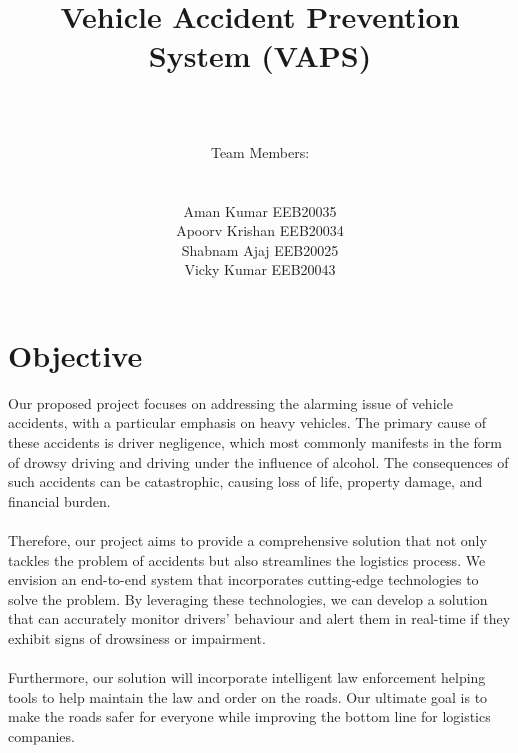 \documentclass{article}
\title{ \begin{center} \LARGE Vehicle Accident Prevention System (VAPS) \end{center} }
\author{\\ \\Team Members: 
\\
\\
\\
Aman Kumar EEB20035\\
Apoorv Krishan EEB20034\\
Shabnam Ajaj EEB20025\\
Vicky Kumar EEB20043\\}
\date{}
\begin{document}
\maketitle
\newpage
\tableofcontents

\newpage

\section{Objective}
Our proposed project focuses on addressing the alarming issue of vehicle accidents, with a particular emphasis on heavy vehicles. The primary cause of these accidents is driver negligence, which most commonly manifests in the form of drowsy driving and driving under the influence of alcohol. The consequences of such accidents can be catastrophic, causing loss of life, property damage, and financial burden.
\\
\\
Therefore, our project aims to provide a comprehensive solution that not only tackles the problem of accidents but also streamlines the logistics process. We envision an end-to-end system that incorporates cutting-edge technologies to solve the problem. By leveraging these technologies, we can develop a solution that can accurately monitor drivers' behaviour and alert them in real-time if they exhibit signs of drowsiness or impairment.
\\
\\
Furthermore, our solution will incorporate intelligent law enforcement helping tools to help maintain the law and order on the roads. Our ultimate goal is to make the roads safer for everyone while improving the bottom line for logistics companies.
\end{document}
